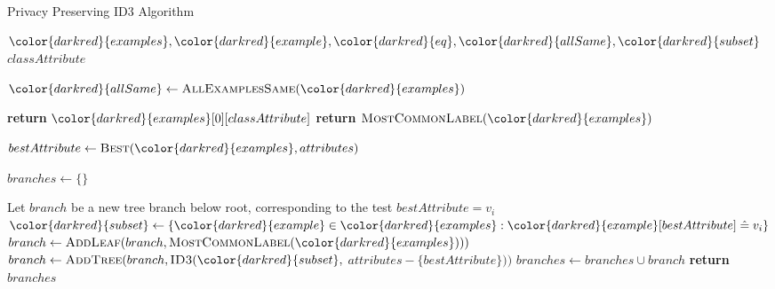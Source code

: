 \begin{algorithm}[H]
\caption{Privacy Preserving ID3 Algorithm}\label{a:id3-pp}
\begin{algorithmic}[1]
\renewcommand{\algorithmicrequire}{\textbf{Private Vars:}}
\Require ${\color{darkred}{examples}}, {\color{darkred}{example}}, {\color{darkred}{eq}}, {\color{darkred}{allSame}}, {\color{darkred}{subset}}$
\renewcommand{\algorithmicrequire}{\textbf{Global Vars:}}
\Require $classAttribute$

    \State ${\color{darkred}{allSame}} \gets \textsc{AllExamplesSame}({\color{darkred}{examples}})$

        \State \textbf{return} ${\color{darkred}{examples}}[0][classAttribute]$
        \State \textbf{return} $\textsc{MostCommonLabel}({\color{darkred}{examples}})$
    \EndIf

    \State $bestAttribute \gets \textsc{Best}({\color{darkred}{examples}}, attributes)$


    \State $branches \gets \{\}$

        \State Let $branch$ be a new tree branch below root, corresponding to the test $bestAttribute = v_i$
        \State ${\color{darkred}{subset}} \gets \{{\color{darkred}{example}} \in {\color{darkred}{examples}} : {\color{darkred}{example}}[bestAttribute] \heq v_i\}$
            \State $branch \gets \textsc{AddLeaf}(branch, \textsc{MostCommonLabel}({\color{darkred}{examples}})))$ 
        \Else
            \State $branch \gets \textsc{AddTree}(branch, \textsc{ID3}({\color{darkred}{subset}},$ $attributes - \{bestAttribute\}))$ 
        \EndIf
        \State $branches \gets branches \cup branch$
    \EndFor
    \State \textbf{return} $branches$

\EndProcedure

\end{algorithmic}
\end{algorithm}

